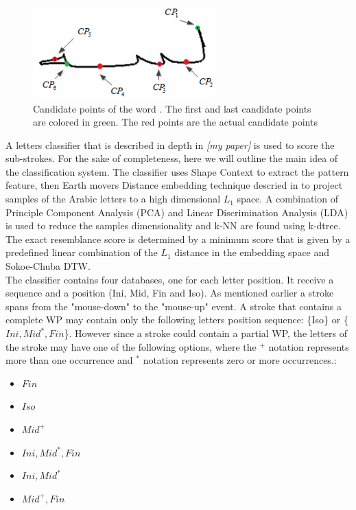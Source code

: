 \documentclass[journal,compsoc]{IEEEtran}
\begin{document}
\begin{figure}
\centering
\includegraphics[width=7cm]{./figures/candidate_points}
\caption{Candidate points of the word  . The first and last candidate points are colored in green. The red points are the actual candidate points}
\label{fig:candidate_points}
\end{figure}

A letters classifier that is described in depth in \emph{[my paper]} is used to score the sub-strokes. For the sake of completeness, here we will outline the main idea of the classification system. The classifier uses Shape Context to extract the pattern feature, then Earth movers Distance embedding technique descried in \cite{shirdhonkar2008approximate} to project samples of the Arabic letters to a high dimensional $L_{1}$ space. A combination of Principle Component Analysis (PCA) and Linear Discrimination Analysis (LDA) is used to reduce the samples dimensionality and k-NN are found using k-dtree. The exact resemblance score is determined by a minimum score that is given by a predefined linear combination of the $L_{1}$ distance in the embedding space and Sokoe-Chuba DTW.\\

The classifier contains four databases, one for each letter position. It receive a sequence and a position (Ini, Mid, Fin and Iso).
As mentioned earlier a stroke spans from the "mouse-down" to the "mouse-up" event. A stroke that contains a complete WP may contain only the following letters position sequence: \{Iso\} or \{$Ini,Mid^{*},Fin$\}.
However since a stroke could contain a partial WP, the letters of the stroke may have one of the following options, where the  $^{+}$ notation represents more than one occurrence and $^{*}$ notation represents zero or more occurrences.:
\begin{multicols}{2}
\begin{itemize}
    \item $Fin$
    \item $Iso$
    \item $Mid^{+}$
    \item $Ini,Mid^{*},Fin$
    \item $Ini,Mid^{*}$
    \item $Mid^{+},Fin$
\end{itemize}
\end{multicols}
 
\end{document}
